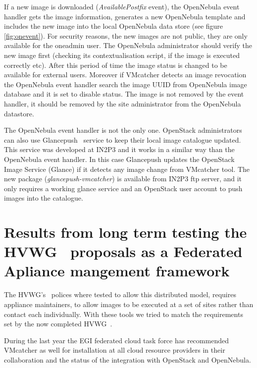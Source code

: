 \documentclass{llncs_Ibergrid2013}
\begin{document}
If a new image is downloaded (\textit{AvailablePostfix} event), the OpenNebula event handler gets the image information, generates a new OpenNebula template and includes the new image into the local OpenNebula data store (see figure \ref{fig:onevent}). 
For security reasons, the new images are not public, they are only available for the oneadmin user. The OpenNebula administrator should verify the new image first (checking its contextualisation script, if the image is executed correctly etc).
After this period of time the image status is changed to be available for external users. 
Moreover if VMcatcher detects an image revocation the OpenNebula event handler search the image UUID from OpenNebula image database and it is set to disable status.
The image is not removed by the event handler, it should be removed by the site administrator from the OpenNebula datastore.

The OpenNebula event handler is not the only one. OpenStack administrators can also use Glancepush~\cite{glancepush} service to keep their local image catalogue updated. 
This service was developed at IN2P3 and it works in a similar way than the OpenNebula event handler. 
In this case Glancepush updates the OpenStack Image Service (Glance) if it detects any image change from VMcatcher tool. 
The new package (\textit{glancepush-vmcatcher}) is available from IN2P3 ftp server, and it only requires a working glance service and an OpenStack user account to push images into the catalogue.



\section{Results from long term testing the HVWG~\cite{hepix} proposals as a Federated Apliance mangement framework}
\label{sect-experiances}
The HVWG's~\cite{hepix} polices where tested to allow this distributed model, requires appliance maintainers, to allow images to be executed at a set of sites rather than contact each individually. With these tools we tried to match the requirements set by the now completed HVWG~\cite{hepix}.

During the last year the EGI federated cloud task force has recommended VMcatcher as well for installation at all cloud resource providers in their collaboration and the status of the integration with OpenStack and OpenNebula.
\end{document}
